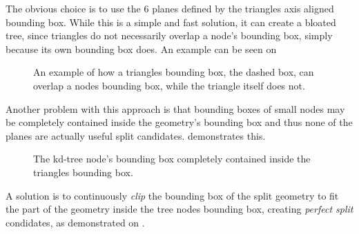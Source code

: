 
The obvious choice is to use the 6 planes defined by the triangles
axis aligned bounding box. While this is a simple and fast solution,
it can create a bloated tree, since triangles do not necessarily
overlap a node's bounding box, simply because its own bounding box
does. An example can be seen on 

\begin{figure}
  \centering

  \vspace{3mm}
  \parbox{5cm}{\caption[Triangle/Node bounding box intersection.]{An
      example of how a triangles bounding box, the dashed box, can
      overlap a nodes bounding box, while the triangle itself does
      not.}\label{fig:aabbSplit}}
\end{figure}

Another problem with this approach is that bounding boxes of small
nodes may be completely contained inside the geometry's bounding box
and thus none of the planes are actually useful split
candidates.  demonstrates this.

\begin{figure}
  \centering
    
  \vspace{3mm}
  \parbox{5cm}{\caption[A tree node's bounding box contained in a
      triangle's bounding box.]{The kd-tree node's bounding box
      completely contained inside the triangles bounding
      box.}\label{fig:aabbContained}}
\end{figure}

A solution is to continuously \textit{clip} the bounding box of the
split geometry to fit the part of the geometry inside the tree nodes
bounding box, creating \textit{perfect split} condidates, as
demonstrated on .

